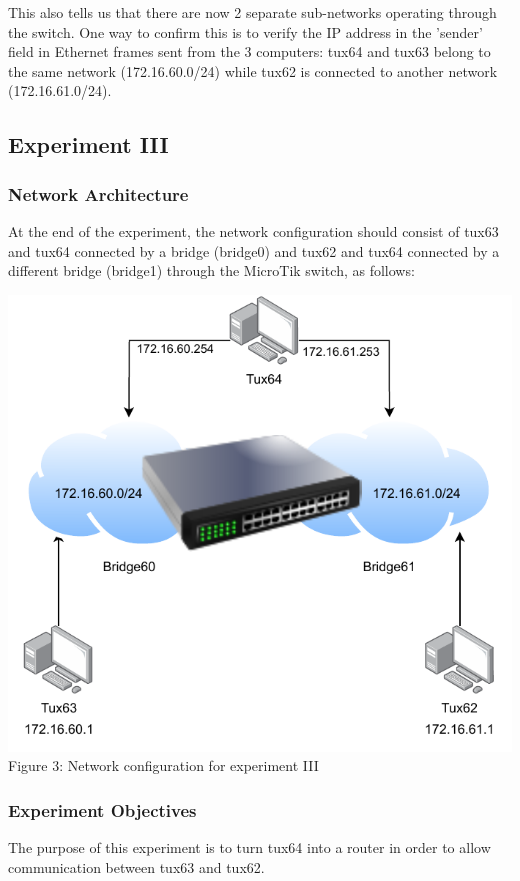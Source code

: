 \documentclass[11pt,a4paper,twocolumn]{article}
\begin{document}
This also tells us that there are now 2 separate sub-networks operating through the switch. One way to confirm this is to verify the IP address in the 'sender' field in Ethernet frames sent from the 3 computers: tux64 and tux63 belong to the same network (172.16.60.0/24) while tux62 is connected to another network (172.16.61.0/24).

\subsection{Experiment III}

\subsubsection{Network Architecture}

At the end of the experiment, the network configuration should consist of tux63 and tux64 connected by a bridge (bridge0) and tux62 and tux64 connected by a different bridge (bridge1) through the MicroTik switch, as follows:

\includegraphics{experiment3}
Figure 3: Network configuration for experiment III

\subsubsection{Experiment Objectives}

The purpose of this experiment is to turn tux64 into a router in order to allow communication between tux63 and tux62.
\end{document}
